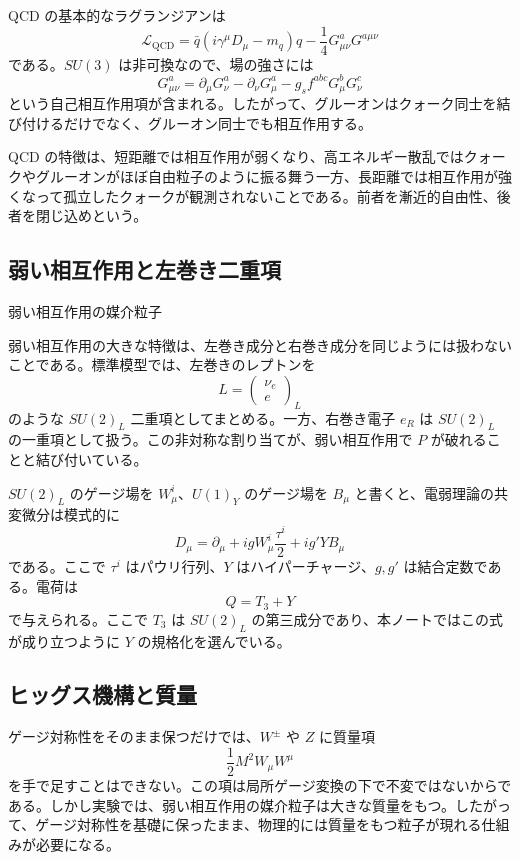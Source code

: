 QCD の基本的なラグランジアンは
\[
\mathcal{L}_{\mathrm{QCD}}
=
\bar{q}(i\gamma^\mu D_\mu-m_q)q
-\frac{1}{4}G_{\mu\nu}^aG^{a\mu\nu}
\]
である。$SU(3)$ は非可換なので、場の強さには
\[
G_{\mu\nu}^a
=
\partial_\mu G_\nu^a-\partial_\nu G_\mu^a
-g_s f^{abc}G_\mu^bG_\nu^c
\]
という自己相互作用項が含まれる。したがって、グルーオンはクォーク同士を結び付けるだけでなく、グルーオン同士でも相互作用する。

QCD の特徴は、短距離では相互作用が弱くなり、高エネルギー散乱ではクォークやグルーオンがほぼ自由粒子のように振る舞う一方、長距離では相互作用が強くなって孤立したクォークが観測されないことである。前者を漸近的自由性、後者を閉じ込めという。

\subsection{弱い相互作用と左巻き二重項}
\begin{experimentalfact}{弱い相互作用の媒介粒子}
\end{experimentalfact}

弱い相互作用の大きな特徴は、左巻き成分と右巻き成分を同じようには扱わないことである。標準模型では、左巻きのレプトンを
\[
L=
\begin{pmatrix}
\nu_e\\
e
\end{pmatrix}_L
\]
のような $SU(2)_L$ 二重項としてまとめる。一方、右巻き電子 $e_R$ は $SU(2)_L$ の一重項として扱う。この非対称な割り当てが、弱い相互作用で $P$ が破れることと結び付いている。

$SU(2)_L$ のゲージ場を $W_\mu^i$、$U(1)_Y$ のゲージ場を $B_\mu$ と書くと、電弱理論の共変微分は模式的に
\[
D_\mu
=
\partial_\mu
+ig W_\mu^i\frac{\tau^i}{2}
+ig'Y B_\mu
\]
である。ここで $\tau^i$ はパウリ行列、$Y$ はハイパーチャージ、$g,g'$ は結合定数である。電荷は
\[
Q=T_3+Y
\]
で与えられる。ここで $T_3$ は $SU(2)_L$ の第三成分であり、本ノートではこの式が成り立つように $Y$ の規格化を選んでいる。

\subsection{ヒッグス機構と質量}
ゲージ対称性をそのまま保つだけでは、$W^\pm$ や $Z$ に質量項
\[
\frac{1}{2}M^2 W_\mu W^\mu
\]
を手で足すことはできない。この項は局所ゲージ変換の下で不変ではないからである。しかし実験では、弱い相互作用の媒介粒子は大きな質量をもつ。したがって、ゲージ対称性を基礎に保ったまま、物理的には質量をもつ粒子が現れる仕組みが必要になる。

